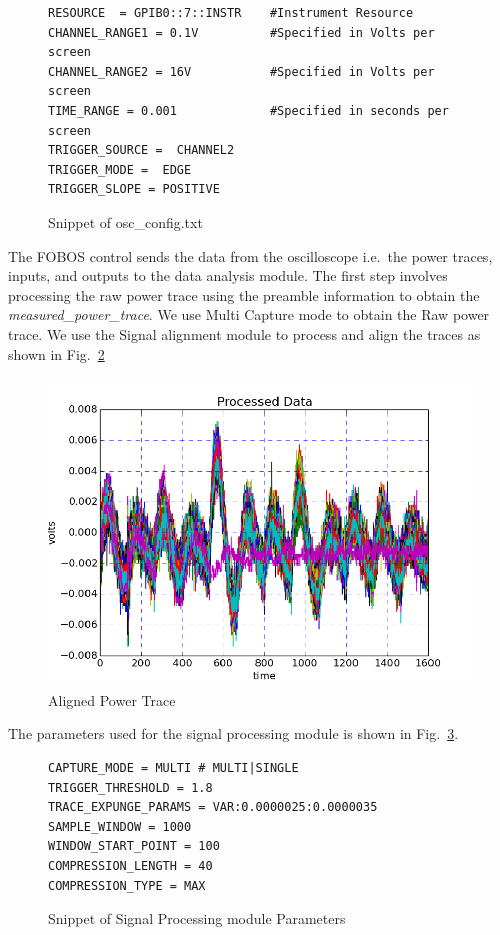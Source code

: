 \documentclass{llncs}
\numberwithin{algorithm}{chapter}
\begin{document}
\begin{figure}[H]
\begin{Verbatim}[frame=single]
RESOURCE  = GPIB0::7::INSTR    #Instrument Resource
CHANNEL_RANGE1 = 0.1V          #Specified in Volts per screen
CHANNEL_RANGE2 = 16V           #Specified in Volts per screen
TIME_RANGE = 0.001             #Specified in seconds per screen
TRIGGER_SOURCE =  CHANNEL2
TRIGGER_MODE =  EDGE  
TRIGGER_SLOPE = POSITIVE
\end{Verbatim}
\caption{\label{fig:fobos:osccon}Snippet of osc\_config.txt}
\end{figure}

The FOBOS control sends the data from the oscilloscope i.e.\ the power traces, inputs, and outputs to
the data analysis module. The first step involves processing the raw 
power trace using the preamble information to obtain the \emph{measured\_power\_trace}.
We use Multi Capture mode to obtain the Raw power trace. We use the Signal alignment 
module to process and align the traces as shown in Fig.~\ref{fig:alpt}


\begin{figure}[H]
\begin{center}
\includegraphics[scale=0.8]{figures/scaTrace1}
\caption{\label{fig:alpt}Aligned Power Trace}
\end{center} 
\vspace{-3ex}
\end{figure}

The parameters used for the signal processing module is shown in Fig.~\ref{fig:fobos:paramsa}.

\begin{figure}[H]
\begin{Verbatim}[frame=single]
CAPTURE_MODE = MULTI # MULTI|SINGLE
TRIGGER_THRESHOLD = 1.8
TRACE_EXPUNGE_PARAMS = VAR:0.0000025:0.0000035
SAMPLE_WINDOW = 1000
WINDOW_START_POINT = 100
COMPRESSION_LENGTH = 40
COMPRESSION_TYPE = MAX
\end{Verbatim}
\caption{\label{fig:fobos:paramsa}Snippet of Signal Processing module Parameters}
\end{figure}
\end{document}
